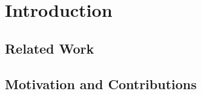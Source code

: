 \chapter{Introduction}
\lipsum[1-2]
\section{Related Work}
\lipsum[1-10]
\section{Motivation and Contributions}
\lipsum[1-10]